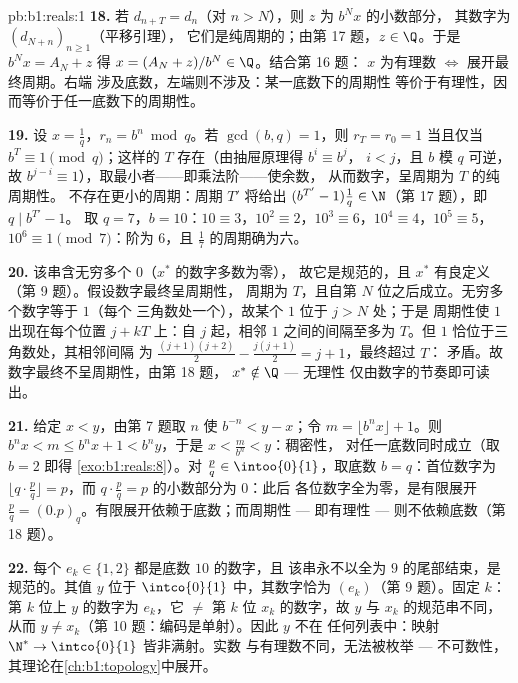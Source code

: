 \begin{solution}{pb:b1:reals:1}
\textbf{18.} 若 $d_{n+T} = d_n$（对 $n > N$），则 $z$ 为 $b^N x$ 的小数部分，
其数字为 $(d_{N+n})_{n\geq1}$（平移引理），
它们是纯周期的；由第 17 题，$z \in \Q$。于是 $b^N
x = A_N + z$ 得 $x = (A_N + z)/b^N \in \Q$。结合第 16 题：
$x$ 为有理数 $\iff$ 展开最终周期。右端
涉及底数，左端则不涉及：某一底数下的周期性
等价于有理性，因而等价于任一底数下的周期性。

\textbf{19.} 设 $x = \frac 1q$，$r_n = b^n \bmod q$。若
$\gcd(b, q) = 1$，则 $r_T = r_0 = 1$ 当且仅当 $b^T \equiv
1 \pmod q$；这样的 $T$ 存在（由抽屉原理得 $b^i \equiv b^j$，
$i < j$，且 $b$ 模 $q$ 可逆，故 $b^{j-i} \equiv
1$），取最小者——即乘法阶——使余数，
从而数字，呈周期为 $T$ 的纯周期性。
不存在更小的周期：周期 $T'$ 将给出 $(b^{T'}
- 1)\frac1q \in \N$（第 17 题），即 $q \mid b^{T'} - 1$。
取 $q = 7$，$b = 10$：$10 \equiv 3$，$10^2 \equiv 2$，$10^3
\equiv 6$，$10^4 \equiv 4$，$10^5 \equiv 5$，$10^6 \equiv 1
\pmod 7$：阶为 $6$，且 $\frac 17$ 的周期确为六。

\textbf{20.} 该串含无穷多个 $0$（$x^*$ 的数字多数为零），
故它是规范的，且 $x^*$ 有良定义
（第 9 题）。假设数字最终呈周期性，
周期为 $T$，且自第 $N$ 位之后成立。无穷多个数字等于 $1$（每个
三角数处一个），故某个 $1$ 位于 $j > N$ 处；于是
周期性使 $1$ 出现在每个位置 $j + kT$ 上：自 $j$
起，相邻 $1$ 之间的间隔至多为 $T$。但
$1$ 恰位于三角数处，其相邻间隔
为 $\frac{(j+1)(j+2)}{2} - \frac{j(j+1)}{2} = j + 1$，最终超过 $T$：
矛盾。故数字最终不呈周期性，由第 18 题，
$x^* \notin \Q$ --- 无理性
仅由数字的节奏即可读出。

\textbf{21.} 给定 $x < y$，由第 7 题取 $n$ 使 $b^{-n}
< y - x$；令 $m = \lfloor b^n x \rfloor + 1$。则 $b^n x < m
\leq b^n x + 1 < b^n y$，于是 $x < \frac{m}{b^n} < y$：稠密性，
对任一底数同时成立（取 $b = 2$ 即得
\cref{exo:b1:reals:8}）。对 $\frac pq \in \intoo{0}{1}$，取底数
$b = q$：首位数字为 $\lfloor q \cdot \frac pq \rfloor =
p$，而 $q \cdot \frac pq = p$ 的小数部分为 $0$：此后
各位数字全为零，是有限展开 $\frac pq =
(0.p)_q$。有限展开依赖于底数；而周期性 ---
即有理性 --- 则不依赖底数（第 18 题）。

\textbf{22.} 每个 $e_k \in \{1, 2\}$ 都是底数 $10$ 的数字，且
该串永不以全为 $9$ 的尾部结束，是规范的。其值 $y$ 位于
$\intco{0}{1}$ 中，其数字恰为 $(e_k)$（第 9 题）。固定
$k$：第 $k$ 位上 $y$ 的数字为 $e_k$，它 $\neq$ 第 $k$ 位
$x_k$ 的数字，故 $y$ 与 $x_k$ 的规范串不同，从而
$y \neq x_k$（第 10 题：编码是单射）。因此 $y$ 不在
任何列表中：映射 $\N^* \to \intco{0}{1}$ 皆非满射。实数
与有理数不同，无法被枚举 ---
不可数性，其理论在\cref{ch:b1:topology}中展开。


\end{solution}

